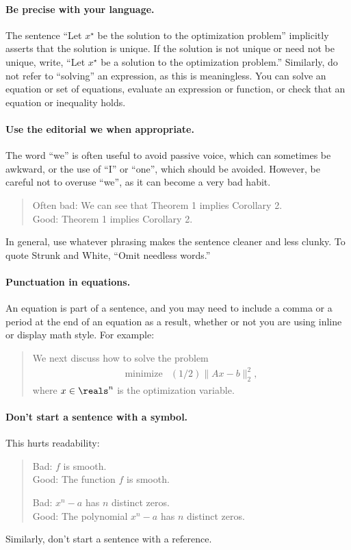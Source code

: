 \documentclass[12pt]{article}
\begin{document}
\paragraph{Be precise with your language.}
The sentence ``Let $x^\star$ be the solution to the optimization
problem'' implicitly asserts that the solution is unique. If the solution is
not unique or need not be unique, write, ``Let $x^\star$ be a solution to the
optimization problem.'' Similarly, do not refer to ``solving'' an expression,
as this is meaningless.  You can solve an equation or set of equations,
evaluate an expression or function, or check that an equation or inequality
holds.

\paragraph{Use the editorial we when appropriate.}
The word ``we'' is often useful to avoid passive voice, which can
sometimes be awkward, or the use of ``I'' or
``one'', which should be avoided. However, be careful not to overuse
``we'', as it can become a very bad habit.
\begin{quote}
Often bad: We can see that Theorem 1 implies Corollary 2.\\
Good: Theorem 1 implies Corollary 2.
\end{quote}
In general, use whatever phrasing makes the sentence cleaner and less clunky.
To quote Strunk and White, ``Omit needless words.''

\paragraph{Punctuation in equations.}
An equation is part of a sentence, and you may need to include a comma or a period
at the end of an equation as a result, whether or not you are using inline or
display math style. For example:
\begin{quote}
    We next discuss how to solve the problem
    \[
        \begin{array}{ll}
            \mbox{minimize} & (1/2)\|Ax - b\|_2^2,
        \end{array}
    \]
    where $x \in \reals^n$ is the optimization variable.
\end{quote}

\paragraph{Don't start a sentence with a symbol.}
This hurts readability:
\begin{quote}
Bad: $f$ is smooth.\\
Good: The function $f$ is smooth.

Bad: $x^n - a$ has $n$ distinct zeros. \\
Good: The polynomial $x^n - a$ has $n$ distinct zeros.
\end{quote}
Similarly, don't start a sentence with a reference.
\end{document}

